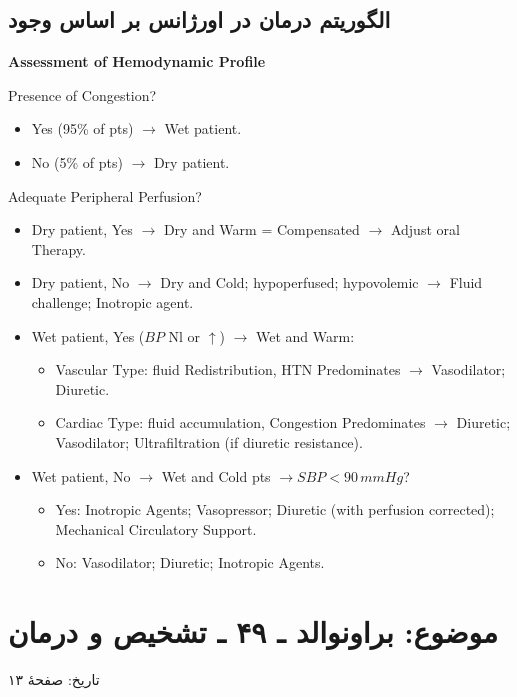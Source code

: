 \documentclass[12pt,a4paper]{article}
\providecommand{\en}[1]{\lr{#1}}
\newcommand{\AHFpage}[1]{\clearpage\section*{موضوع: براونوالد ـ ۴۹ ـ تشخیص و درمان \en{AHF}}{\footnotesize تاریخ: \en{/ /}\quad صفحهٔ #1\par}}
\begin{document}
\subsection*{الگوریتم درمان \en{AHF} در اورژانس بر اساس وجود \en{Congestion}}
\begin{latin}
\textbf{Assessment of Hemodynamic Profile}
\par Presence of Congestion?
\begin{itemize}
\item Yes (95\% of pts) $\longrightarrow$ Wet patient.
\item No (5\% of pts) $\longrightarrow$ Dry patient.
\end{itemize}
\par Adequate Peripheral Perfusion?
\begin{itemize}
\item Dry patient, Yes $\longrightarrow$ Dry and Warm = Compensated $\longrightarrow$ Adjust oral Therapy.
\item Dry patient, No $\longrightarrow$ Dry and Cold; hypoperfused; hypovolemic $\longrightarrow$ Fluid challenge; Inotropic agent.
\item Wet patient, Yes ($BP$ Nl or $\uparrow$) $\longrightarrow$ Wet and Warm:
  \begin{itemize}
  \item Vascular Type: fluid Redistribution, HTN Predominates $\longrightarrow$ Vasodilator; Diuretic.
  \item Cardiac Type: fluid accumulation, Congestion Predominates $\longrightarrow$ Diuretic; Vasodilator; Ultrafiltration (if diuretic resistance).
  \end{itemize}
\item Wet patient, No $\longrightarrow$ Wet and Cold pts $\longrightarrow SBP<90\,mmHg$?
  \begin{itemize}
  \item Yes: Inotropic Agents; Vasopressor; Diuretic (with perfusion corrected); Mechanical Circulatory Support.
  \item No: Vasodilator; Diuretic; Inotropic Agents.
  \end{itemize}
\end{itemize}
\end{latin}

\AHFpage{۱۳}
\end{document}
